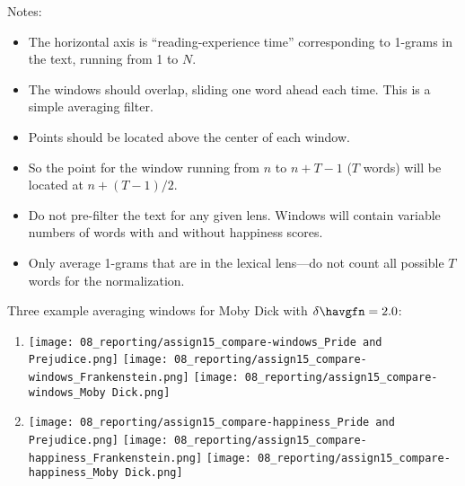 \begin{enumerate}
  Notes:
  \begin{itemize}
  \item 
    The horizontal axis is ``reading-experience time'' corresponding to 1-grams in the text,
    running from 1 to $N$.
  \item
    The windows should overlap, sliding one word ahead each time.
    This is a simple averaging filter.
  \item
    Points should be located above
    the center of each window.
  \item
    So the point for the window running from
    $n$ to $n+T-1$ ($T$ words) will be located at $n + (T-1)/2$.
  \item
    Do not pre-filter the text for any given lens.
    Windows will contain variable numbers
    of words with and without happiness scores.
  \item
    Only average 1-grams that are in the lexical lens---do not count all possible $T$ words for the normalization. 
  \end{itemize}

  Three example averaging windows for Moby Dick
  with $\delta \havgfn = 2.0$:
%  


  
   \solutionstart

   	\begin{enumerate}
   		\item 
	   		\texttt{[image: 08\_reporting/assign15\_compare-windows\_Pride and Prejudice.png]}
	  		\texttt{[image: 08\_reporting/assign15\_compare-windows\_Frankenstein.png]}
			\texttt{[image: 08\_reporting/assign15\_compare-windows\_Moby Dick.png]}
 		
 		\item
 			\texttt{[image: 08\_reporting/assign15\_compare-happiness\_Pride and Prejudice.png]}
 			\texttt{[image: 08\_reporting/assign15\_compare-happiness\_Frankenstein.png]}
 			\texttt{[image: 08\_reporting/assign15\_compare-happiness\_Moby Dick.png]}
   	\end{enumerate}

   \solutionend

  
\end{enumerate}


